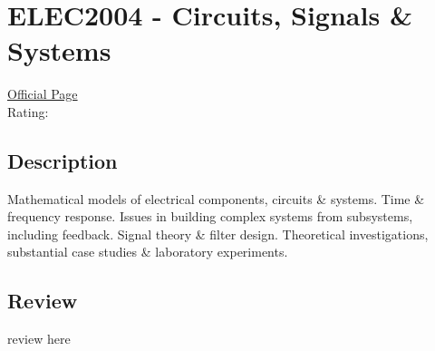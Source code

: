 \hypertarget{ELEC2004}{\section{ELEC2004 - Circuits, Signals \& Systems}}

\large
\textcolor{turbo_purple}{\href{https://my.uq.edu.au/programs-courses/course.html?course_code=ELEC2004}{Official Page}} \\
Rating: \cstar\cstar\cstar\cstar\ostar

\normalsize
\subsection*{Description}
Mathematical models of electrical components, circuits \& systems.
Time \& frequency response. Issues in building complex systems from subsystems, including feedback.
Signal theory \& filter design.
Theoretical investigations, substantial case studies \& laboratory experiments.

\subsection*{Review}
review here
